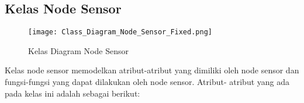         
     
\subsection{Kelas Node Sensor}

    \begin{figure}[H]
    	\centering  
    	\texttt{[image: Class\_Diagram\_Node\_Sensor\_Fixed.png]}
    	\caption[Kelas Diagram Node Sensor]{Kelas Diagram Node Sensor} 
    	\label{fig:Kelas Diagram Node Sensor} 
    \end{figure}
    
    Kelas node sensor memodelkan atribut-atribut yang dimiliki oleh node sensor dan fungsi-fungsi yang dapat dilakukan oleh node sensor. 
    Atribut- atribut yang ada pada kelas ini adalah sebagai berikut:
    
